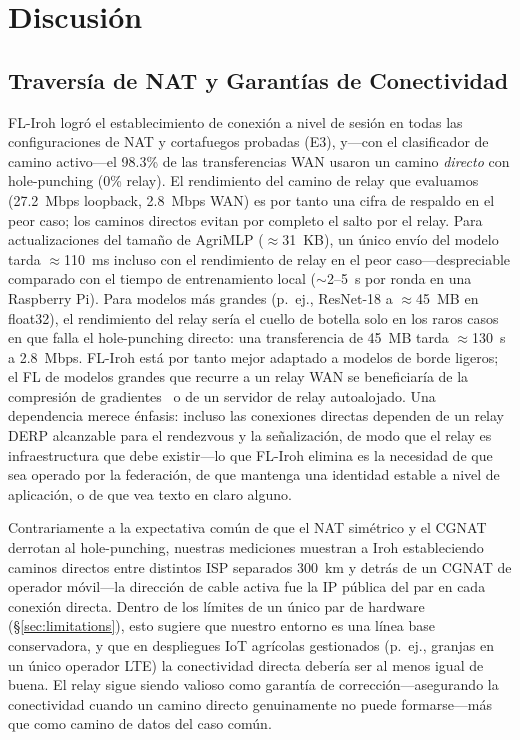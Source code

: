 \documentclass[journal]{IEEEtran}
\begin{document}
\section{Discusión}
\label{sec:discussion}

\subsection{Traversía de NAT y Garantías de Conectividad}

FL-Iroh logró el establecimiento de conexión a nivel de sesión en todas las configuraciones de NAT y cortafuegos probadas (E3), y---con el clasificador de camino activo---el 98.3\% de las transferencias WAN usaron un camino \emph{directo} con hole-punching (0\% relay). El rendimiento del camino de relay que evaluamos (27.2~Mbps loopback, 2.8~Mbps WAN) es por tanto una cifra de respaldo en el peor caso; los caminos directos evitan por completo el salto por el relay. Para actualizaciones del tamaño de AgriMLP ($\approx$31~KB), un único envío del modelo tarda $\approx$110~ms incluso con el rendimiento de relay en el peor caso---despreciable comparado con el tiempo de entrenamiento local ($\sim$2--5~s por ronda en una Raspberry Pi). Para modelos más grandes (p.~ej., ResNet-18 a $\approx$45~MB en float32), el rendimiento del relay sería el cuello de botella solo en los raros casos en que falla el hole-punching directo: una transferencia de 45~MB tarda $\approx$130~s a 2.8~Mbps. FL-Iroh está por tanto mejor adaptado a modelos de borde ligeros; el FL de modelos grandes que recurre a un relay WAN se beneficiaría de la compresión de gradientes~\cite{konecny2016} o de un servidor de relay autoalojado. Una dependencia merece énfasis: incluso las conexiones directas dependen de un relay DERP alcanzable para el rendezvous y la señalización, de modo que el relay es infraestructura que debe existir---lo que FL-Iroh elimina es la necesidad de que sea operado por la federación, de que mantenga una identidad estable a nivel de aplicación, o de que vea texto en claro alguno.

Contrariamente a la expectativa común de que el NAT simétrico y el CGNAT derrotan al hole-punching, nuestras mediciones muestran a Iroh estableciendo caminos directos entre distintos ISP separados 300~km y detrás de un CGNAT de operador móvil---la dirección de cable activa fue la IP pública del par en cada conexión directa. Dentro de los límites de un único par de hardware (\S\ref{sec:limitations}), esto sugiere que nuestro entorno es una línea base conservadora, y que en despliegues IoT agrícolas gestionados (p.~ej., granjas en un único operador LTE) la conectividad directa debería ser al menos igual de buena. El relay sigue siendo valioso como garantía de corrección---asegurando la conectividad cuando un camino directo genuinamente no puede formarse---más que como camino de datos del caso común.
\end{document}
